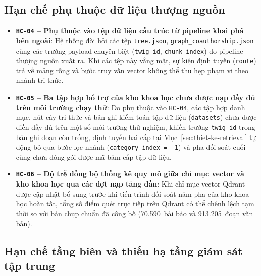 \subsection{Hạn chế phụ thuộc dữ liệu thượng nguồn}
\label{subsec:han-che-du-lieu}

\begin{itemize}
\item[--] \textbf{\texttt{HC-04} -- Phụ thuộc vào tệp dữ liệu cấu trúc từ pipeline khai phá bên ngoài}: Hệ thống đòi hỏi các tệp \texttt{tree.json}, \texttt{graph\_coauthorship.json} cùng các trường payload chuyên biệt (\texttt{twig\_id}, \texttt{chunk\_index}) do pipeline thượng nguồn xuất ra. Khi các tệp này vắng mặt, sự kiện định tuyến (\texttt{route}) trả về mảng rỗng và bước truy vấn vector không thể thu hẹp phạm vi theo nhánh tri thức.
\item[--] \textbf{\texttt{HC-05} -- Ba tập hợp bổ trợ của kho khoa học chưa được nạp đầy đủ trên môi trường chạy thử}: Do phụ thuộc vào \texttt{HC-04}, các tập hợp danh mục, nút cây tri thức và bản ghi kiểm toán tập dữ liệu (\texttt{datasets}) chưa được điền đầy đủ trên một số môi trường thử nghiệm, khiến trường \texttt{twig\_id} trong bản ghi đoạn còn trống, định tuyến hai cấp tại Mục~\ref{sec:thiet-ke-retrieval} tự động bỏ qua bước lọc nhánh (\texttt{category\_index = -1}) và pha đối soát cuối cùng chưa đóng gói được mã băm cấp tập dữ liệu.
\item[--] \textbf{\texttt{HC-06} -- Độ trễ đồng bộ thống kê quy mô giữa chỉ mục vector và kho khoa học qua các đợt nạp tăng dần}: Khi chỉ mục vector Qdrant được cập nhật bổ sung trước khi tiến trình đối soát năm pha của kho khoa học hoàn tất, tổng số điểm quét trực tiếp trên Qdrant có thể chênh lệch tạm thời so với bản chụp chuẩn đã công bố (70.590~bài báo và 913.205~đoạn văn bản).
\end{itemize}

\subsection{Hạn chế tầng biên và thiếu hạ tầng giám sát tập trung}
\label{subsec:han-che-tang-bien}

